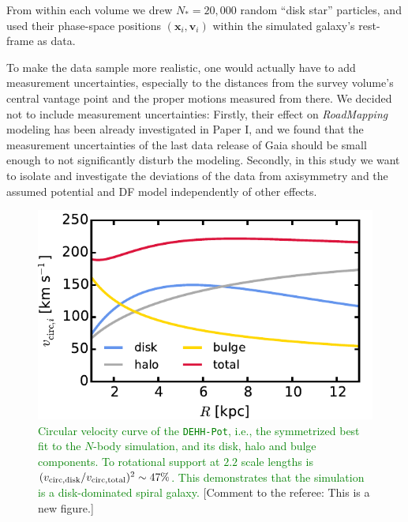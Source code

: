 \documentclass[iop,revtex4,numberedappendix,appendixfloats]{emulateapj}
\newcommand{\vect}[1]{\boldsymbol{#1}}
\newcommand{\RM}{{\sl RoadMapping}}
\newcommand{\NEW}[1]{\textcolor{Green}{#1}}
\newcommand{\COMMENT}[1]{\textcolor{ProcessBlue}{#1}}
\begin{document}
From within each volume we drew $N_*=20,000$ random ``disk star'' particles, and used their phase-space positions $(\vect{x}_i,\vect{v}_i)$ within the simulated galaxy's rest-frame as data. 

To make the data sample more realistic, one would actually have to add measurement uncertainties, especially to the distances from the survey volume's central vantage point and the proper motions measured from there. We decided not to include measurement uncertainties: Firstly, their effect on \RM{} modeling has been already investigated in Paper I, and we found that the measurement uncertainties of the last data release of Gaia should be small enough to not significantly disturb the modeling. Secondly, in this study we want to isolate and investigate the deviations of the data from axisymmetry and the assumed potential and DF model independently of other effects.

\begin{figure}[!htbp]
\centering
\includegraphics[width=0.7\columnwidth]{fig/plot_vcirc_decomposed_2.pdf}
\caption{\NEW{Circular velocity curve of the \texttt{DEHH-Pot}, i.e., the symmetrized best fit to the $N$-body simulation, and its disk, halo and bulge components. To rotational support at $2.2$ scale lengths is $(v_{\rm circ,disk}/v_{\rm circ,total})^2 \sim 47\%$. This demonstrates that the simulation is a disk-dominated spiral galaxy.} \COMMENT{[Comment to the referee: This is a new figure.]}}
\label{fig:DEHH_vcirc_decomposed}
\end{figure}
\end{document}
